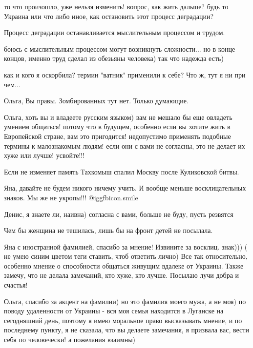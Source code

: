 \begin{itemize}

то что произошло, уже нельзя изменить! вопрос, как жить дальше? будь то Украина
или что либо иное, как остановить этот процесс деградации?

Процесс деградации останавливается мыслительным процессом и трудом.

боюсь с мыслительным процессом могут возникнуть сложности... но в конце концов, именно труд сделал из обезьяны человека) так что надежда есть)

как и кого я оскорбила? термин "ватник" применили к себе? Что ж, тут я ни при чем...

Ольга, Вы правы. Зомбированных тут нет. Только думающие.


Ольга, хоть вы и владеете русским языком) вам не мешало бы еще овладеть умением
общаться! потому что в будущем, особенно если вы хотите жить в Европейской
стране, вам это пригодится! недопустимо применять подобные термины к
малознакомым людям! если они с вами не согласны, это не делает их хуже или
лучше! усвойте!!!


Если не изменяет память Тахкомыш спалил Москву после Куликовской битвы.

Яна, давайте не будем никого ничему учить. И вообще меньше восклицательных знаков. Мы же не укропы!!!  @igg{fbicon.smile} 

Денис, я знаете ли, наивна) согласна с вами, больше не буду, пусть резвятся

Чем бы женщина не тешилась, лишь бы на фронт детей не посылала.


Яна с иностранной фамилией, спасибо за мнение! Извините за восклиц. знак))) (
не умею синим цветом теги ставить, чтоб ответить лично) Все так относительно,
особенно мнение о способности общаться живущим вдалеке от Украины. Также
замечу, что не делала замечаний, кто хуже, кто лучше. Посылаю лучи добра и
счастья!


Ольга, спасибо за акцент на фамилии) но это фамилия моего мужа, а не моя) по
поводу удаленности от Украины - вся моя семья находится в Луганске на
сегодняшний день, поэтому я имею моральное право высказывать мнение, и по
последнему пункту, я не сказала, что вы делаете замечания, я призвала вас,
вести себя по человечески! а пожелания взаимны)


\end{itemize}
